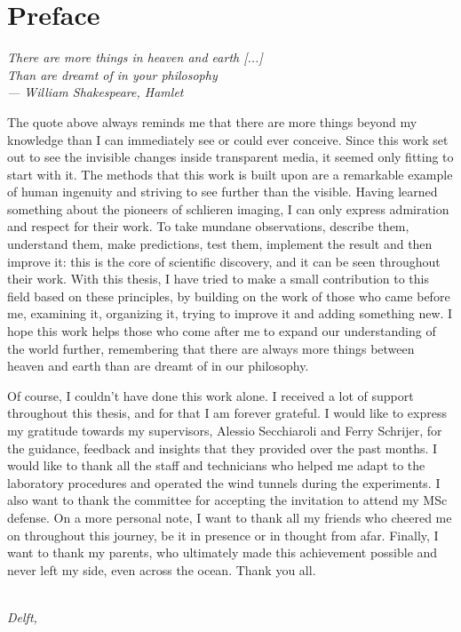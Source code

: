 \chapter*{Preface}

\begin{flushright}
{\makeatletter\itshape
    There are more things in heaven and earth [...] \\
    Than are dreamt of in your philosophy \\
    --- William Shakespeare, \emph{Hamlet}
\makeatother}
\end{flushright}


The quote above always reminds me that there are more things beyond my knowledge than I can immediately see or could ever conceive. Since this work set out to see the invisible changes inside transparent media, it seemed only fitting to start with it. The methods that this work is built upon are a remarkable example of human ingenuity and striving to see further than the visible. Having learned something about the pioneers of schlieren imaging, I can only express admiration and respect for their work. To take mundane observations, describe them, understand them, make predictions, test them, implement the result and then improve it: this is the core of scientific discovery, and it can be seen throughout their work. With this thesis, I have tried to make a small contribution to this field based on these principles, by building on the work of those who came before me, examining it, organizing it, trying to improve it and adding something new. I hope this work helps those who come after me to expand our understanding of the world further, remembering that there are always more things between heaven and earth than are dreamt of in our philosophy.

Of course, I couldn't have done this work alone. I received a lot of support throughout this thesis, and for that I am forever grateful. I would like to express my gratitude towards my supervisors, Alessio Secchiaroli and Ferry Schrijer, for the guidance, feedback and insights that they provided over the past months. I would like to thank all the staff and technicians who helped me adapt to the laboratory procedures and operated the wind tunnels during the experiments. I also want to thank the committee for accepting the invitation to attend my MSc defense. On a more personal note, I want to thank all my friends who cheered me on throughout this journey, be it in presence or in thought from afar. Finally, I want to thank my parents, who ultimately made this achievement possible and never left my side, even across the ocean. Thank you all.

\begin{flushright}
{\makeatletter\itshape
    \@author \\
    Delft, \monthname{} \the\year{}
\makeatother}
\end{flushright}
